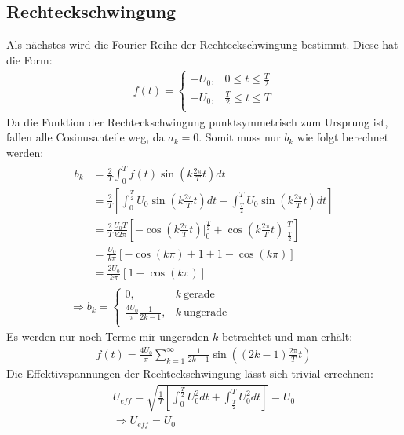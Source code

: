 \subsection*{Rechteckschwingung}
\label{sub:square}
Als nächstes wird die Fourier-Reihe der Rechteckschwingung bestimmt. Diese hat die Form:
\begin{gather}
    f(t) = 
    \begin{cases}
        +U_0, & 0 \leq t \leq \frac{T}{2} \\
        -U_0, & \frac{T}{2} \leq t \leq T \\
    \end{cases}
\end{gather}
Da die Funktion der Rechteckschwingung punktsymmetrisch zum Ursprung ist, fallen alle Cosinusanteile weg, da $a_k = 0$. Somit muss nur $b_k$ wie folgt berechnet werden:
\begin{gather}
    \begin{aligned}
        b_k &= \frac{2}{T} \int^{T}_{0} f(t)\sin(k \frac{2\pi}{T} t)dt\\
            &= \frac{2}{T} \left[ \int^{\frac{T}{2}}_{0} U_0\sin(k \frac{2\pi}{T} t)dt - \int^{T}_{\frac{T}{2}} U_0\sin(k \frac{2\pi}{T} t)dt\right]\\
            &= \frac{2}{T}\frac{U_0T}{k2\pi} \left[-\cos(k \frac{2\pi}{T} t) \bigg \vert^{\frac{T}{2}}_{0} + \cos(k \frac{2\pi}{T} t) \bigg \vert^{T}_{\frac{T}{2}} \right]\\
            &= \frac{U_0}{k\pi} \left[-\cos(k\pi)+1 + 1 - \cos(k\pi)\right]\\
            &= \frac{2U_0}{k\pi}\left[1-\cos(k\pi)\right]
    \end{aligned}\\[0,5cm]
    \Rightarrow \boxed{b_k =
    \begin{cases}
        0, & k~\text{gerade}\\
        \frac{4U_0}{\pi}\frac{1}{2k-1}, & k~\text{ungerade}\\
    \end{cases}}
\end{gather} 
Es werden nur noch Terme mir ungeraden $k$ betrachtet und man erhält:
\begin{gather}
    \boxed{f(t) = \frac{4U_0}{\pi} \sum^{\infty}_{k=1} \frac{1}{2k-1} \sin((2k-1)\frac{2\pi}{T}t)}
\end{gather}
Die Effektivspannungen der Rechteckschwingung lässt sich trivial errechnen:
\begin{gather}
    U_{eff} = \sqrt{\frac{1}{T}\left[\int^{\frac{T}{2}}_0 U_0^2dt + \int^T_{\frac{T}{2}} U_0^2 dt\right]} = U_0\\[0,5cm]
    \Rightarrow\boxed{U_{eff} = U_0}
\end{gather}
\newpage

